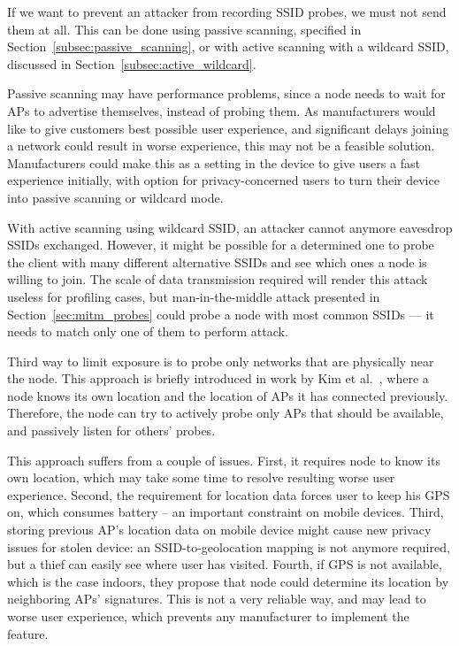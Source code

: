 \documentclass[12pt,a4paper,oneside,pdftex]{report}
\begin{document}
If we want to prevent an attacker from recording SSID probes, we must not send them at all. This can be done using passive scanning, specified in Section~\ref{subsec:passive_scanning}, or with active scanning with a wildcard SSID, discussed in Section~\ref{subsec:active_wildcard}.

Passive scanning may have performance problems, since a node needs to wait for APs to advertise themselves, instead of probing them. As manufacturers would like to give customers best possible user experience, and significant delays joining a network could result in worse experience, this may not be a feasible solution. Manufacturers could make this as a setting in the device to give users a fast experience initially, with option for privacy-concerned users to turn their device into passive scanning or wildcard mode.

With active scanning using wildcard SSID, an attacker cannot anymore eavesdrop SSIDs exchanged. However, it might be possible for a determined one to probe the client with many different alternative SSIDs and see which ones a node is willing to join. The scale of data transmission required will render this attack useless for profiling cases, but man-in-the-middle attack presented in Section~\ref{sec:mitm_probes} could probe a node with most common SSIDs --- it needs to match only one of them to perform attack.

Third way to limit exposure is to probe only networks that are physically near the node. This approach is briefly introduced in work by Kim et al.~\cite{kimposter}, where a node knows its own location and the location of APs it has connected previously. Therefore, the node can try to actively probe only APs that should be available, and passively listen for others' probes. 

This approach suffers from a couple of issues. First, it requires node to know its own location, which may take some time to resolve resulting worse user experience. Second, the requirement for location data forces user to keep his GPS on, which consumes battery -- an important constraint on mobile devices. Third, storing previous AP's location data on mobile device might cause new privacy issues for stolen device: an SSID-to-geolocation mapping is not anymore required, but a thief can easily see where user has visited. Fourth, if GPS is not available, which is the case indoors, they propose that node could determine its location by neighboring APs' signatures. This is not a very reliable way, and may lead to worse user experience, which prevents any manufacturer to implement the feature.
\end{document}
